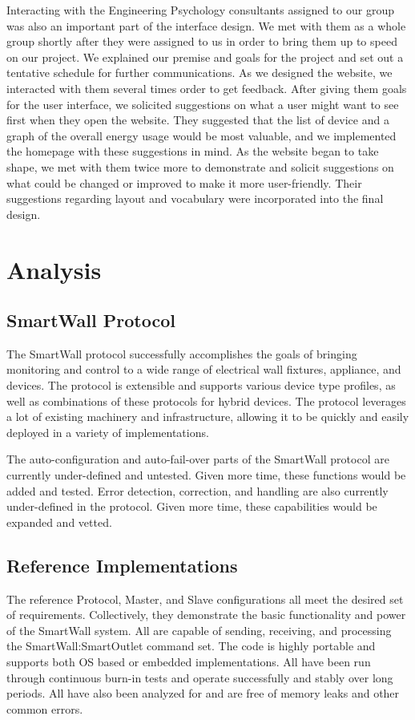 \documentclass[11pt]{article}
\begin{document}
Interacting with the
Engineering Psychology consultants assigned to our group was also an
important part of the interface design. We met with
them as a whole group shortly after they were assigned to us in order
to bring them up to speed on our project. We explained our premise
and goals for the project and set out a tentative schedule for
further communications. As we designed the website, we interacted
with them several times order to get feedback. After giving them
goals for the user interface, we solicited suggestions on what a user
might want to see first when they open the website. They suggested
that the list of device and a graph of the overall energy usage would
be most valuable, and we implemented the homepage with these
suggestions in mind. As the website began to take shape, we met with
them twice more to demonstrate and solicit suggestions on what could
be changed or improved to make it more user-friendly. Their
suggestions regarding layout and vocabulary were incorporated into
the final design. 

\section{Analysis}
\subsection{SmartWall Protocol}
The SmartWall protocol successfully accomplishes the goals of bringing
monitoring and control to a wide range of electrical wall fixtures,
appliance, and devices. The protocol is extensible and supports
various device type profiles, as well as combinations of these
protocols for hybrid devices. The protocol leverages a lot of existing
machinery and infrastructure, allowing it to be quickly and easily
deployed in a variety of implementations.

The auto-configuration and auto-fail-over parts of the SmartWall protocol
are currently under-defined and untested. Given more time, these
functions would be added and tested. Error detection, correction, and
handling are also currently under-defined in the protocol. Given more
time, these capabilities would be expanded and vetted.

\subsection{Reference Implementations}
The reference Protocol, Master, and Slave configurations all meet the
desired set of requirements. Collectively, they demonstrate the basic
functionality and power of the SmartWall system. All are capable of
sending, receiving, and processing the SmartWall:SmartOutlet command
set. The code is highly portable and supports both OS based or
embedded implementations. All have been run through continuous burn-in
tests and operate successfully and stably over long periods. All have
also been analyzed for and are free of memory leaks and other common errors.
\end{document}

